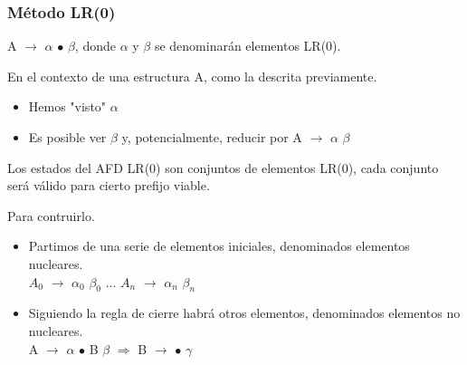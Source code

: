 \documentclass[\main/ApuntesPL.tex]{subfiles}
\begin{document}
      \subsubsection{Método LR(0)}
        \par
        A $\rightarrow$ $\alpha$ $\bullet$ $\beta$, donde $\alpha$ y $\beta$ se
        denominarán elementos LR(0).

        \par
        En el contexto de una estructura A, como la descrita previamente.
        \begin{itemize}
          \item Hemos "visto" $\alpha$
          \item Es posible ver $\beta$ y, potencialmente, reducir por A
            $\rightarrow$ $\alpha$ $\beta$
        \end{itemize}

        \begin{center}
        \end{center}

        \par
        Los estados del AFD LR(0) son conjuntos de elementos LR(0), cada
        conjunto será válido para cierto prefijo viable.

        \bigskip
        Para contruirlo.
        \begin{itemize}
          \item Partimos de una serie de elementos iniciales, denominados
            elementos nucleares.\\
            $A_0$ $\rightarrow$ $\alpha_0$ $\beta_0$ ... $A_n$ $\rightarrow$
            $\alpha_n$ $\beta_n$
          \item Siguiendo la regla de cierre habrá otros elementos, denominados
            elementos no nucleares.\\
            A $\rightarrow$ $\alpha$ $\bullet$ B $\beta$ $\Rightarrow$ B
            $\rightarrow$ $\bullet$ $\gamma$
        \end{itemize}
\end{document}

